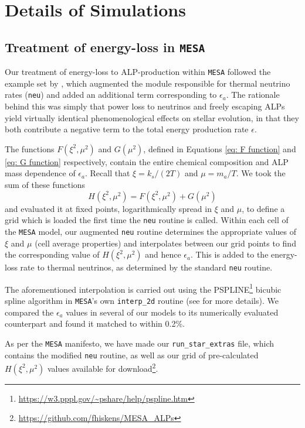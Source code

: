 \section{Details of Simulations}

\subsection{Treatment of energy-loss in \texttt{MESA}}
\label{Sec: AppA}
Our treatment of energy-loss to ALP-production within \texttt{MESA} followed the example set by \cite{Friedland:2012hj}, which augmented the module responsible for thermal neutrino rates (\texttt{neu}) and added an additional term corresponding to $\epsilon_a$. The rationale behind this was simply that power loss to neutrinos and freely escaping ALPs yield virtually identical phenomenological effects on stellar evolution, in that they both contribute a negative term to the total energy production rate $\epsilon$.


The functions $F(\xi^2, \mu^2)$ and $G(\mu^2)$, defined in Equations \ref{eq: F function} and \ref{eq: G function} respectively, contain the entire chemical composition and ALP mass dependence of $\epsilon_a$. Recall that $\xi=k_s/(2T)$ and $\mu=m_a/T$. We took the sum of these functions
\begin{equation}
    H(\xi^2, \mu^2)=F(\xi^2, \mu^2)+G(\mu^2) 
\end{equation}
and evaluated it at fixed points, logarithmically spread in $\xi$ and $\mu$, to define a grid which is loaded the first time the \texttt{neu} routine is called. Within each cell of the \texttt{MESA} model, our augmented \texttt{neu} routine determines the appropriate values of $\xi$ and $\mu$ (cell average properties) and interpolates between our grid points to find the corresponding value of $H(\xi^2, \mu^2)$ and hence $\epsilon_a$. This is added to the energy-loss rate to thermal neutrinos, as determined by the standard \texttt{neu} routine.

The aforementioned interpolation is carried out using the PSPLINE\footnote{\url{https://w3.pppl.gov/\~pshare/help/pspline.htm}} bicubic spline algorithm in \texttt{MESA}'s own \texttt{interp\_2d} routine (see \cite{MESA1} for more details). We compared the $\epsilon_a$ values in several of our models to its numerically evaluated counterpart and found it matched to within 0.2\%.
 
As per the \texttt{MESA} manifesto, we have made our \texttt{run\_star\_extras} file, which contains the modified \texttt{neu} routine, as well as our grid of pre-calculated $H(\xi^2, \mu^2)$ values available for download\footnote{\url{https://github.com/fhiskens/MESA\_ALPs}}.

